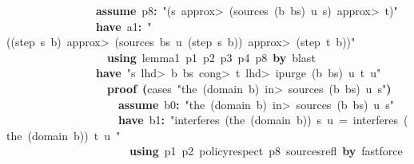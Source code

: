\documentclass{article}
\newcommand{\syntaxKEYWORDA}[1]{\textcolor[rgb]{0.0,0.4,0.6}{\textbf{#1}}}
\newcommand{\syntaxKEYWORDC}[1]{\textcolor[rgb]{0.0,0.6,1.0}{\textbf{#1}}}
\newcommand{\syntaxLITERALA}[1]{\textcolor[rgb]{1.0,0.0,0.8}{#1}}
\newcommand{\syntaxOPERATOR}[1]{\textcolor[rgb]{0.0,0.0,0.0}{\textbf{#1}}}
\newcommand{\syntaxKEYWORDA}[1]{\textcolor[rgb]{0.0,0.4,0.6}{\textbf{#1}}}
\newcommand{\syntaxKEYWORDC}[1]{\textcolor[rgb]{0.0,0.6,1.0}{\textbf{#1}}}
\newcommand{\syntaxLITERALA}[1]{\textcolor[rgb]{1.0,0.0,0.8}{#1}}
\newcommand{\syntaxOPERATOR}[1]{\textcolor[rgb]{0.0,0.0,0.0}{\textbf{#1}}}
\newcommand{\syntaxKEYWORDA}[1]{\textcolor[rgb]{0.0,0.4,0.6}{\textbf{#1}}}
\newcommand{\syntaxKEYWORDC}[1]{\textcolor[rgb]{0.0,0.6,1.0}{\textbf{#1}}}
\newcommand{\syntaxLITERALA}[1]{\textcolor[rgb]{1.0,0.0,0.8}{#1}}
\newcommand{\syntaxOPERATOR}[1]{\textcolor[rgb]{0.0,0.0,0.0}{\textbf{#1}}}
\newcommand{\syntaxKEYWORDA}[1]{\textcolor[rgb]{0.0,0.4,0.6}{#1}}
\newcommand{\syntaxKEYWORDC}[1]{\textcolor[rgb]{0.0,0.6,1.0}{#1}}
\newcommand{\syntaxLITERALA}[1]{\textcolor[rgb]{1.0,0.0,0.8}{\textbf{#1}}}
\newcommand{\syntaxOPERATOR}[1]{\textcolor[rgb]{0.0,0.0,0.0}{#1}}
\newcommand{\syntaxKEYWORDA}[1]{\textcolor[rgb]{0.0,0.4,0.6}{\textbf{#1}}}
\newcommand{\syntaxKEYWORDC}[1]{\textcolor[rgb]{0.0,0.6,1.0}{\textbf{#1}}}
\newcommand{\syntaxLITERALA}[1]{\textcolor[rgb]{1.0,0.0,0.8}{#1}}
\newcommand{\syntaxOPERATOR}[1]{\textcolor[rgb]{0.0,0.0,0.0}{\textbf{#1}}}
\newcommand{\syntaxKEYWORDA}[1]{\textcolor[rgb]{0.0,0.4,0.6}{\textbf{#1}}}
\newcommand{\syntaxKEYWORDC}[1]{\textcolor[rgb]{0.0,0.6,1.0}{\textbf{#1}}}
\newcommand{\syntaxLITERALA}[1]{\textcolor[rgb]{1.0,0.0,0.8}{#1}}
\newcommand{\syntaxOPERATOR}[1]{\textcolor[rgb]{0.0,0.0,0.0}{\textbf{#1}}}
\begin{document}
{\ }{\ }{\ }{\ }{\ }{\ }{\ }{\ }{\ }{\ }{\ }{\ }{\ }{\ }{\ }{\ }\syntaxKEYWORDC{assume}{\ }p8\syntaxOPERATOR{:}{\ }\syntaxLITERALA{"(s{\ }\<approx>{\ }(sources{\ }(b{\ }\usebox{\hashbox}{\ }bs){\ }u{\ }s){\ }\<approx>{\ }t)"}\hspace*{\fill}\\
{\ }{\ }{\ }{\ }{\ }{\ }{\ }{\ }{\ }{\ }{\ }{\ }{\ }{\ }{\ }{\ }\syntaxKEYWORDA{have}{\ }a1\syntaxOPERATOR{:}{\ }\syntaxLITERALA{"((step{\ }s{\ }b){\ }\<approx>{\ }(sources{\ }bs{\ }u{\ }(step{\ }s{\ }b)){\ }\<approx>{\ }(step{\ }t{\ }b))"}\hspace*{\fill}\\
{\ }{\ }{\ }{\ }{\ }{\ }{\ }{\ }{\ }{\ }{\ }{\ }{\ }{\ }{\ }{\ }{\ }{\ }\syntaxKEYWORDA{using}{\ }lemma\usebox{\underscorebox}1{\ }p1{\ }p2{\ }p3{\ }p4{\ }p8{\ }\syntaxKEYWORDA{by}{\ }blast\hspace*{\fill}\\
{\ }{\ }{\ }{\ }{\ }{\ }{\ }{\ }{\ }{\ }{\ }{\ }{\ }{\ }{\ }{\ }\syntaxKEYWORDA{have}{\ }\syntaxLITERALA{"s{\ }\<lhd>{\ }b{\ }\usebox{\hashbox}{\ }bs{\ }\<cong>{\ }t{\ }\<lhd>{\ }ipurge{\ }(b{\ }\usebox{\hashbox}{\ }bs){\ }u{\ }t{\ }\usebox{\atbox}{\ }u"}\hspace*{\fill}\\
{\ }{\ }{\ }{\ }{\ }{\ }{\ }{\ }{\ }{\ }{\ }{\ }{\ }{\ }{\ }{\ }{\ }{\ }\syntaxKEYWORDA{proof}{\ }\syntaxOPERATOR{(}cases{\ }\syntaxLITERALA{"the{\ }(domain{\ }b){\ }\<in>{\ }sources{\ }(b{\ }\usebox{\hashbox}{\ }bs){\ }u{\ }s"}\syntaxOPERATOR{)}\hspace*{\fill}\\
{\ }{\ }{\ }{\ }{\ }{\ }{\ }{\ }{\ }{\ }{\ }{\ }{\ }{\ }{\ }{\ }{\ }{\ }{\ }{\ }\syntaxKEYWORDC{assume}{\ }b0\syntaxOPERATOR{:}{\ }\syntaxLITERALA{"the{\ }(domain{\ }b){\ }\<in>{\ }sources{\ }(b{\ }\usebox{\hashbox}{\ }bs){\ }u{\ }s"}\hspace*{\fill}\\
{\ }{\ }{\ }{\ }{\ }{\ }{\ }{\ }{\ }{\ }{\ }{\ }{\ }{\ }{\ }{\ }{\ }{\ }{\ }{\ }\syntaxKEYWORDA{have}{\ }b1\syntaxOPERATOR{:}{\ }\syntaxLITERALA{"interferes{\ }(the{\ }(domain{\ }b)){\ }s{\ }u{\ }={\ }interferes{\ }(the{\ }(domain{\ }b)){\ }t{\ }u{\ }"}\hspace*{\fill}\\
{\ }{\ }{\ }{\ }{\ }{\ }{\ }{\ }{\ }{\ }{\ }{\ }{\ }{\ }{\ }{\ }{\ }{\ }{\ }{\ }{\ }{\ }\syntaxKEYWORDA{using}{\ }p1{\ }p2{\ }policy\usebox{\underscorebox}respect{\ }p8{\ }sources\usebox{\underscorebox}refl{\ }\syntaxKEYWORDA{by}{\ }fastforce\hspace*{\fill}\\
\end{document}
